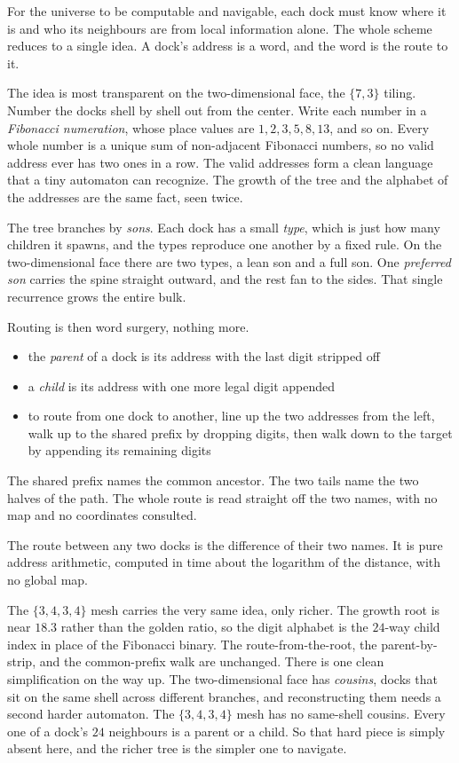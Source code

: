 For the universe to be computable and navigable, each dock must know where it is and who its neighbours are from local information alone. The whole scheme reduces to a single idea. A dock's address is a word, and the word is the route to it.

The idea is most transparent on the two-dimensional face, the $\{7,3\}$ tiling. Number the docks shell by shell out from the center. Write each number in a \emph{Fibonacci numeration}, whose place values are $1, 2, 3, 5, 8, 13$, and so on. Every whole number is a unique sum of non-adjacent Fibonacci numbers, so no valid address ever has two ones in a row. The valid addresses form a clean language that a tiny automaton can recognize. The growth of the tree and the alphabet of the addresses are the same fact, seen twice.

The tree branches by \emph{sons}. Each dock has a small \emph{type}, which is just how many children it spawns, and the types reproduce one another by a fixed rule. On the two-dimensional face there are two types, a lean son and a full son. One \emph{preferred son} carries the spine straight outward, and the rest fan to the sides. That single recurrence grows the entire bulk.

Routing is then word surgery, nothing more.

\begin{itemize}
\item the \emph{parent} of a dock is its address with the last digit stripped off
\item a \emph{child} is its address with one more legal digit appended
\item to route from one dock to another, line up the two addresses from the left, walk up to the shared prefix by dropping digits, then walk down to the target by appending its remaining digits
\end{itemize}

The shared prefix names the common ancestor. The two tails name the two halves of the path. The whole route is read straight off the two names, with no map and no coordinates consulted.

\begin{result}
The route between any two docks is the difference of their two names. It is pure address arithmetic, computed in time about the logarithm of the distance, with no global map.
\end{result}

The $\{3,4,3,4\}$ mesh carries the very same idea, only richer. The growth root is near $18.3$ rather than the golden ratio, so the digit alphabet is the $24$-way child index in place of the Fibonacci binary. The route-from-the-root, the parent-by-strip, and the common-prefix walk are unchanged. There is one clean simplification on the way up. The two-dimensional face has \emph{cousins}, docks that sit on the same shell across different branches, and reconstructing them needs a second harder automaton. The $\{3,4,3,4\}$ mesh has no same-shell cousins. Every one of a dock's $24$ neighbours is a parent or a child. So that hard piece is simply absent here, and the richer tree is the simpler one to navigate.

